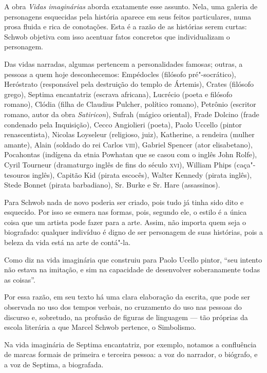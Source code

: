 \documentclass[12pt]{extarticle}
\begin{document}
A obra \textit{Vidas imaginárias} aborda exatamente esse assunto. Nela, uma
galeria de personagens esquecidas pela história aparece em seus feitos
particulares, numa prosa fluida e rica de conotações. Esta é a razão de
as histórias serem curtas: Schwob objetiva com isso acentuar fatos
concretos que individualizam o personagem.

Das vidas narradas, algumas pertencem a personalidades famosas; outras,
a pessoas a quem hoje desconhecemos: Empédocles (filósofo
pré"-socrático), Heróstrato (responsável pela destruição do templo de
Ártemis), Crates (filósofo grego), Septima encantatriz (escrava
africana), Lucrécio (poeta e filósofo romano), Clódia (filha de Claudius
Pulcher, político romano), Petrônio (escritor romano, autor da obra
\textit{Satiricon}), Sufrah (mágico oriental), Frade Dolcino (frade condenado
pela Inquisição), Cecco Angiolieri (poeta), Paolo Uccello (pintor
renascentista), Nicolas Loyseleur (religioso, juiz), Katherine, a
rendeira (mulher amante), Alain (soldado do rei Carlos \textsc{viii}), Gabriel
Spencer (ator elisabetano), Pocahontas (indígena da etnia Powhatan que
se casou com o inglês John Rolfe), Cyril Tourneur (dramaturgo inglês de
fins do século \textsc{xvi}), William Phips (caça"-tesouros inglês), Capitão Kid
(pirata escocês), Walter Kennedy (pirata inglês), Stede Bonnet (pirata
barbadiano), Sr. Burke e Sr. Hare (assassinos).

Para Schwob nada de novo poderia ser criado, pois tudo já tinha sido
dito e esquecido. Por isso se esmera nas formas, pois, segundo ele, o
estilo é a única coisa que um artista pode fazer para a arte. Assim, não
importa quem seja o biografado: qualquer indivíduo é digno de ser
personagem de suas histórias, pois a beleza da vida está na arte de
contá"-la.

Como diz na vida imaginária que construiu para Paolo Ucello pintor,
``seu intento não estava na imitação, e sim na capacidade de desenvolver
soberanamente todas as coisas''.

Por essa razão, em seu texto há uma clara elaboração da escrita, que
pode ser observada no uso dos tempos verbais, no cruzamento do uso nas
pessoas do discurso e, sobretudo, na profusão de figuras de linguagem --- tão próprias da escola literária a que Marcel Schwob pertence, o
Simbolismo.

Na vida imaginária de Septima encantatriz, por exemplo, notamos a
confluência de marcas formais de primeira e terceira pessoa: a voz do narrador, o
biógrafo, e a voz de Septima, a biografada.
\end{document}
